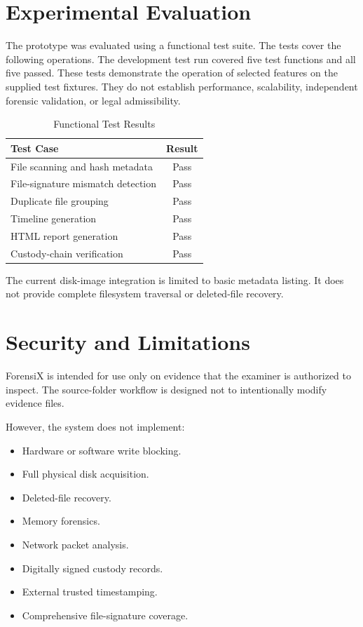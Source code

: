 \documentclass[conference]{IEEEtran}
\begin{document}
\section{Experimental Evaluation}
The prototype was evaluated using a functional test suite. The tests cover the following operations. The development test run covered five test functions and all five passed. These tests demonstrate the operation of selected features on the supplied test fixtures. They do not establish performance, scalability, independent forensic validation, or legal admissibility.

\begin{table}[!t]
\caption{Functional Test Results}
\label{tab:tests}
\centering
\begin{tabular}{|p{}|c|}
\hline
\textbf{Test Case} & \textbf{Result}\\
\hline
File scanning and hash metadata & Pass\\
File-signature mismatch detection & Pass\\
Duplicate file grouping & Pass\\
Timeline generation & Pass\\
HTML report generation & Pass\\
Custody-chain verification & Pass\\
\hline
\end{tabular}
\end{table}

The current disk-image integration is limited to basic metadata listing. It does not provide complete filesystem traversal or deleted-file recovery.

\section{Security and Limitations}
ForensiX is intended for use only on evidence that the examiner is authorized to inspect. The source-folder workflow is designed not to intentionally modify evidence files.

However, the system does not implement:
\begin{itemize}
    \item Hardware or software write blocking.
    \item Full physical disk acquisition.
    \item Deleted-file recovery.
    \item Memory forensics.
    \item Network packet analysis.
    \item Digitally signed custody records.
    \item External trusted timestamping.
    \item Comprehensive file-signature coverage.
\end{itemize}
\end{document}
